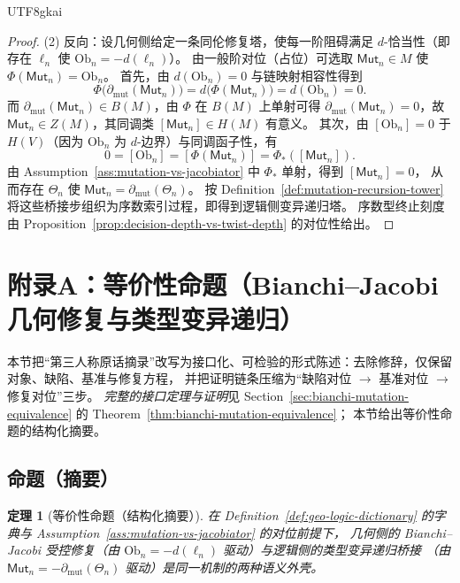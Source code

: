 \documentclass[12pt]{article}
\newtheorem{theorem}{定理}[section]
\newcommand{\Layer}{\ensuremath{\ell}}
\newcommand{\Ob}{\mathrm{Ob}}
\begin{document}
\begin{CJK*}{UTF8}{gkai}
\begin{proof}
(2) 反向：设几何侧给定一条同伦修复塔，使每一阶阻碍满足 $d$-恰当性（即存在 $\Layer_n$ 使 $\Ob_n=-d(\Layer_n)$）。
由一般阶对位（占位）可选取 $\mathsf{Mut}_n\in M$ 使 $\Phi(\mathsf{Mut}_n)=\Ob_n$。
首先，由 $d(\Ob_n)=0$ 与链映射相容性得到
\[
  \Phi\bigl(\partial_{\mathrm{mut}}(\mathsf{Mut}_n)\bigr)
  =
  d\bigl(\Phi(\mathsf{Mut}_n)\bigr)
  =
  d(\Ob_n)
  =
  0.
\]
而 $\partial_{\mathrm{mut}}(\mathsf{Mut}_n)\in B(M)$，由 $\Phi$ 在 $B(M)$ 上单射可得
$\partial_{\mathrm{mut}}(\mathsf{Mut}_n)=0$，故 $\mathsf{Mut}_n\in Z(M)$，其同调类 $[\mathsf{Mut}_n]\in H(M)$ 有意义。
其次，由 $[\Ob_n]=0$ 于 $H(V)$（因为 $\Ob_n$ 为 $d$-边界）与同调函子性，有
\[
  0
  =
  [\Ob_n]
  =
  [\Phi(\mathsf{Mut}_n)]
  =
  \Phi_*([\mathsf{Mut}_n]).
\]
由 Assumption~\ref{ass:mutation-vs-jacobiator} 中 $\Phi_*$ 单射，得到 $[\mathsf{Mut}_n]=0$，
从而存在 $\Theta_n$ 使 $\mathsf{Mut}_n=\partial_{\mathrm{mut}}(\Theta_n)$。
按 Definition~\ref{def:mutation-recursion-tower} 将这些桥接步组织为序数索引过程，即得到逻辑侧变异递归塔。
序数型终止刻度由 Proposition~\ref{prop:decision-depth-vs-twist-depth} 的对位性给出。
\end{proof}

\clearpage

\section{附录A：等价性命题（Bianchi--Jacobi 几何修复与类型变异递归）}
\label{sec:equivalence-clean-statement}

本节把“第三人称原话摘录”改写为接口化、可检验的形式陈述：去除修辞，仅保留对象、缺陷、基准与修复方程，
并把证明链条压缩为“缺陷对位 $\rightarrow$ 基准对位 $\rightarrow$ 修复对位”三步。
\emph{完整的接口定理与证明}见 Section~\ref{sec:bianchi-mutation-equivalence} 的 Theorem~\ref{thm:bianchi-mutation-equivalence}；
本节给出等价性命题的结构化摘要。

\subsection{命题（摘要）}

\begin{theorem}[等价性命题（结构化摘要）]
在 Definition~\ref{def:geo-logic-dictionary} 的字典与 Assumption~\ref{ass:mutation-vs-jacobiator} 的对位前提下，
几何侧的 Bianchi--Jacobi 受控修复（由 $\Ob_n=-d(\Layer_n)$ 驱动）与逻辑侧的类型变异递归桥接
（由 $\mathsf{Mut}_n=-\partial_{\mathrm{mut}}(\Theta_n)$ 驱动）是同一机制的两种语义外壳。
\end{theorem}


\end{CJK*}
\end{document}
